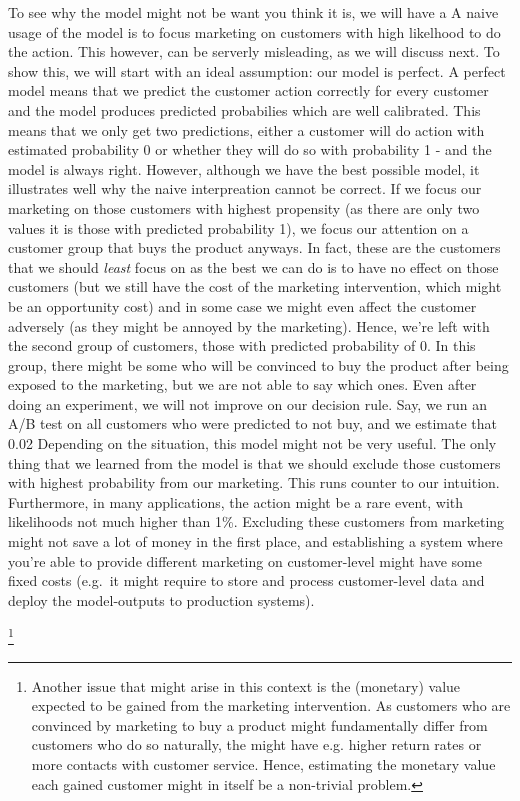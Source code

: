 \documentclass[
]{book}
\theoremstyle{definition}
\theoremstyle{definition}
\theoremstyle{definition}
\theoremstyle{remark}
\begin{document}
To see why the model might not be want you think it is, we will have a
A naive usage of the model is to focus marketing on customers with high likelhood to do the action. This however, can be serverly misleading, as we will discuss next. To show this, we will start with an ideal assumption: our model is perfect. A perfect model means that we predict the customer action correctly for every customer and the model produces predicted probabilies which are well calibrated. This means that we only get two predictions, either a customer will do action with estimated probability 0 or whether they will do so with probability 1 - and the model is always right.
However, although we have the best possible model, it illustrates well why the naive interpreation cannot be correct. If we focus our marketing on those customers with highest propensity (as there are only two values it is those with predicted probability 1), we focus our attention on a customer group that buys the product anyways. In fact, these are the customers that we should \emph{least} focus on as the best we can do is to have no effect on those customers (but we still have the cost of the marketing intervention, which might be an opportunity cost) and in some case we might even affect the customer adversely (as they might be annoyed by the marketing). Hence, we're left with the second group of customers, those with predicted probability of 0. In this group, there might be some who will be convinced to buy the product after being exposed to the marketing, but we are not able to say which ones. Even after doing an experiment, we will not improve on our decision rule. Say, we run an A/B test on all customers who were predicted to not buy, and we estimate that 0.02
Depending on the situation, this model might not be very useful. The only thing that we learned from the model is that we should exclude those customers with highest probability from our marketing. This runs counter to our intuition. Furthermore, in many applications, the action might be a rare event, with likelihoods not much higher than 1\%. Excluding these customers from marketing might not save a lot of money in the first place, and establishing a system where you're able to provide different marketing on customer-level might have some fixed costs (e.g.~it might require to store and process customer-level data and deploy the model-outputs to production systems).

\footnote{Another issue that might arise in this context is the (monetary) value expected to be gained from the marketing intervention. As customers who are convinced by marketing to buy a product might fundamentally differ from customers who do so naturally, the might have e.g. higher return rates or more contacts with customer service. Hence, estimating the monetary value each gained customer might in itself be a non-trivial problem.}
\end{document}
